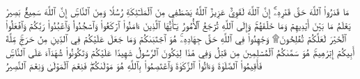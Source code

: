 مَا قَدَرُواْ ٱللَّهَ حَقَّ قَدۡرِهِۦٓۚ إِنَّ ٱللَّهَ لَقَوِيٌّ عَزِيزٌ
ٱللَّهُ يَصۡطَفِي مِنَ ٱلۡمَلَـٰٓئِكَةِ رُسُلٗا وَمِنَ ٱلنَّاسِۚ إِنَّ ٱللَّهَ سَمِيعُۢ بَصِيرٞ
يَعۡلَمُ مَا بَيۡنَ أَيۡدِيهِمۡ وَمَا خَلۡفَهُمۡۚ وَإِلَى ٱللَّهِ تُرۡجَعُ ٱلۡأُمُورُ
يَـٰٓأَيُّهَا ٱلَّذِينَ ءَامَنُواْ ٱرۡكَعُواْ وَٱسۡجُدُواْۤ وَٱعۡبُدُواْ رَبَّكُمۡ وَٱفۡعَلُواْ ٱلۡخَيۡرَ لَعَلَّكُمۡ تُفۡلِحُونَ۩
وَجَٰهِدُواْ فِي ٱللَّهِ حَقَّ جِهَادِهِۦۚ هُوَ ٱجۡتَبَىٰكُمۡ وَمَا جَعَلَ عَلَيۡكُمۡ فِي ٱلدِّينِ مِنۡ حَرَجٖۚ مِّلَّةَ أَبِيكُمۡ إِبۡرَٰهِيمَۚ هُوَ سَمَّىٰكُمُ ٱلۡمُسۡلِمِينَ مِن قَبۡلُ وَفِي هَٰذَا لِيَكُونَ ٱلرَّسُولُ شَهِيدًا عَلَيۡكُمۡ وَتَكُونُواْ شُهَدَآءَ عَلَى ٱلنَّاسِۚ فَأَقِيمُواْ ٱلصَّلَوٰةَ وَءَاتُواْ ٱلزَّكَوٰةَ وَٱعۡتَصِمُواْ بِٱللَّهِ هُوَ مَوۡلَىٰكُمۡۖ فَنِعۡمَ ٱلۡمَوۡلَىٰ وَنِعۡمَ ٱلنَّصِيرُ